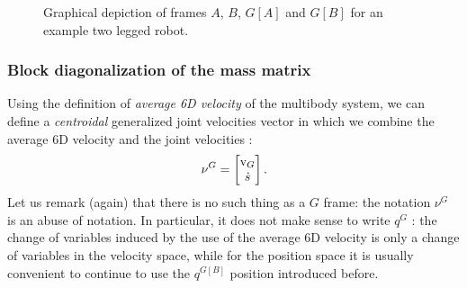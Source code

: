 \begin{figure}
\caption{Graphical depiction of frames $A$, $B$, $G[A]$ and $G[B]$ for an example two legged robot.}
\label{fig:centroidalFigure}
\end{figure}

\subsubsection{Block diagonalization of the mass matrix}
Using the definition of \emph{average 6D velocity} of the multibody system, we can define a \emph{centroidal} generalized joint velocities vector in which we combine the average 6D velocity and the joint velocities :
\begin{equation}
\nu^G 
= 
\begin{bmatrix}
 {\rm v}_G \\
 {\dot{s}} 
\end{bmatrix}.
\end{equation}
Let us remark (again) that there is no such thing as a $G$ frame: the notation $\nu^G$ is an abuse of notation. In particular, it does not make sense to write $q^G$ : the change of variables induced by the use of the average 6D velocity is only a change of variables in the velocity space, while for the position space it is usually convenient to continue to use the $q^{G[B]}$ position introduced before.

